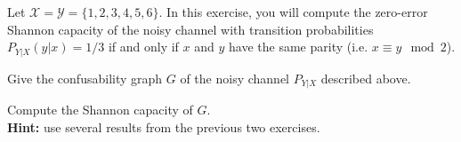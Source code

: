 \documentclass[a4paper,10pt,landscape,twocolumn]{scrartcl}
\begin{document}
\begin{exercise}
Let $\mathcal{X} = \mathcal{Y} = \{1,2,3,4,5,6\}$. In this exercise, you will compute the zero-error Shannon capacity of the noisy channel with transition probabilities $P_{Y|X}(y|x) = 1/3$ if and only if $x$ and $y$ have the same parity (i.e. $x \equiv y \mod 2$).
	\begin{subex}[(2pt)]
	Give the confusability graph $G$ of the noisy channel $P_{Y|X}$ described above.
	\end{subex}
	\begin{subex}[(4pt)]
	Compute the Shannon capacity of $G$.
	\\\textbf{Hint:} use several results from the previous two exercises.
	\end{subex}
\end{exercise}
\end{document}
